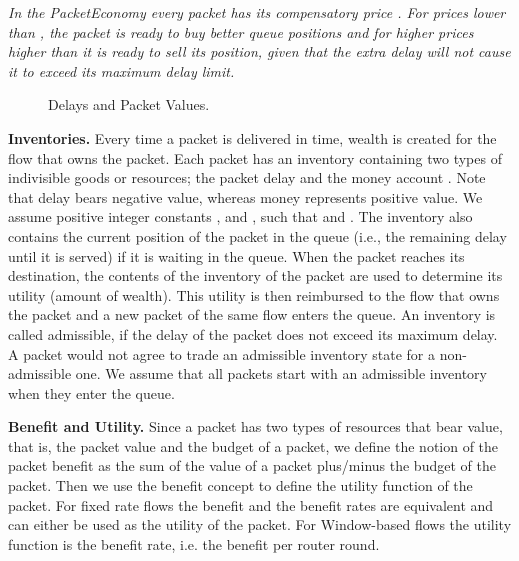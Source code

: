 \documentclass[letterpaper,10pt]{llncs}
\newcommand{\hla}[1]{\hl{#1}}
\renewcommand{\hla}[1]{#1}
\begin{document}
\emph{In the PacketEconomy every packet has its compensatory price . For prices lower than ,
the packet is ready to buy better queue positions and for higher prices higher than  it is ready 
to sell its position, given that the extra delay will not cause it to exceed its maximum delay limit.
}

\begin{figure}[!h]
\hspace{0.02\textwidth}
\caption{Delays and Packet Values.} \label{fig:DelayValues}
\end{figure}


\textbf{Inventories.}
Every time a packet is delivered in time, wealth is created for the flow that owns
the packet. Each packet  has an inventory  containing two types of indivisible 
goods or resources;
the packet delay  and the money account .
Note that delay bears negative value, whereas money represents positive value.
We assume positive integer constants ,  and , such that 
 and . 
The inventory also contains the current position  of the packet in the queue
(i.e., the remaining delay until it is served) if it is waiting in the queue.
When the packet reaches its destination, the contents of
the inventory of the packet are used to determine its utility (amount of wealth).
This utility is then reimbursed to the flow that owns the packet and a new packet
of the same flow enters the queue.
\hla{An inventory is called admissible, if the delay of the packet does not exceed its maximum 
delay. A packet would not agree to trade an admissible inventory state for a non-admissible one.
We assume that all packets start with an admissible inventory when they enter the queue.}

\textbf{Benefit and Utility.}
Since a packet has two types of resources that bear value, that is, the packet value and the budget of a packet,
we define the notion of the packet benefit as the sum of the value of a packet plus/minus the budget of the packet.
Then we use the benefit concept to define the utility function of the packet.
For fixed rate flows the benefit and the benefit rates
are equivalent and can either be used as the utility of the packet.
For Window-based flows the utility function is the benefit rate, i.e. the benefit per router round.
\end{document}
